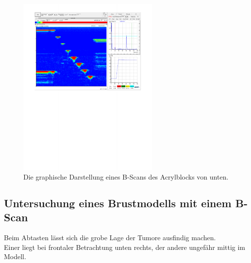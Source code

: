 \begin{figure}[H]
  \centering
  \includegraphics[width = 7cm]{content/bscan_unten.pdf}
  \caption{Die graphische Darstellung eines B-Scans des Acrylblocks von unten.}
  \label{fig:bunten}
\end{figure}


\subsection{Untersuchung eines Brustmodells mit einem B-Scan}
Beim Abtasten lässt sich die grobe Lage der Tumore ausfindig machen. \\
Einer liegt bei frontaler Betrachtung unten rechts, der andere ungefähr mittig im Modell.

